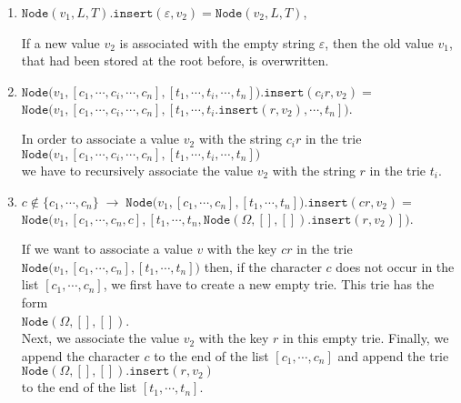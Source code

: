 \begin{enumerate}
\item $\mathtt{Node}(v_1,L,T).\mathtt{insert}(\varepsilon, v_2) = \mathtt{Node}(v_2,L,T)$,
  
      If a new value $v_2$ is associated with the empty string $\varepsilon$, then the old value
      $v_1$, that had been stored at the root before, is overwritten.
\item $\mathtt{Node}\bigl(v_1,[c_1,\cdots,c_i,\cdots,c_n], [t_1,\cdots,t_i,\cdots,t_n]\bigr).\mathtt{insert}(c_ir,v_2) =$ \\[0.2cm]
      \hspace*{1.3cm}  
      $\mathtt{Node}\bigl(v_1,[c_1,\cdots,c_i,\cdots,c_n], [t_1,\cdots,t_i.\mathtt{insert}(r,v_2),\cdots,t_n]\bigr)$.

      In order to associate a value $v_2$ with the string $c_ir$ in the trie
      \\[0.2cm]
      \hspace*{1.3cm}
      $\mathtt{Node}\bigl(v_1,[c_1,\cdots,c_i,\cdots,c_n], [t_1,\cdots,t_i,\cdots,t_n]\bigr)$ 
      \\[0.2cm]
      we have to recursively associate the value $v_2$ with the string $r$ in the trie $t_i$.
\item $c \not\in\{c_1,\cdots,c_n\} \;\rightarrow\;\mathtt{Node}\bigl(v_1,[c_1,\cdots,c_n], [t_1,\cdots,t_n]\bigr).\mathtt{insert}(cr,v_2) =$ \\[0.2cm]
      \hspace*{1.3cm}  
      $\mathtt{Node}\bigl(v_1,[c_1,\cdots,c_n,c], [t_1,\cdots,t_n,\mathtt{Node}(\Omega,[],[]).\mathtt{insert}(r,v_2)]\bigr)$.
      
      If we want to associate a value $v$ with the key $cr$ in the trie
      $\mathtt{Node}\bigl(v_1,[c_1,\cdots,c_n], [t_1,\cdots,t_n]\bigr)$ then, if the character $c$
      does not occur in the list $[c_1,\cdots,c_n]$, we first have to create a new empty trie.
      This trie has the form \\[0.2cm]
      \hspace*{1.3cm} $\mathtt{Node}(\Omega, [], [])$. \\[0.2cm]
      Next, we associate the value $v_2$ with the key $r$ in this empty trie.  Finally,
      we append the character $c$ to the end of the list $[c_1,\cdots,c_n]$ and append the trie
        \\[0.2cm] 
      \hspace*{1.3cm}
      $\mathtt{Node}(\Omega, [], []).\mathtt{insert}(r,v_2)$ 
      \\[0.2cm]
      to the end of the list $[t_1,\cdots,t_n]$.
\end{enumerate}

